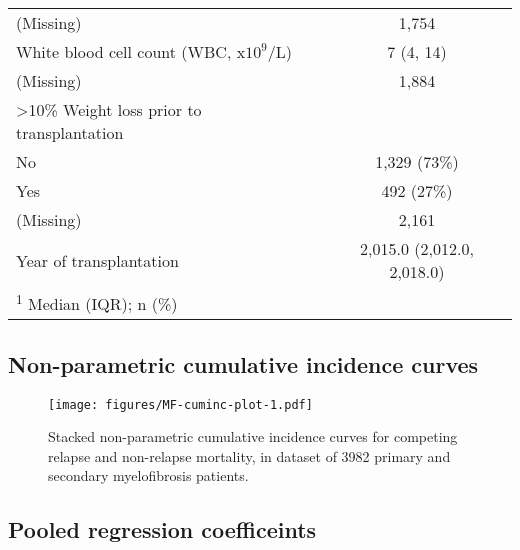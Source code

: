 \documentclass[
  12pt,
  a4paper,
]{article}
\begin{document}
\begin{longtable}[t]{lc}
\hspace{1em}(Missing) & 1,754\\
White blood cell count (WBC, x$10^9$/L) & 7 (4, 14)\\
\hspace{1em}(Missing) & 1,884\\
>10\% Weight loss prior to transplantation & \\
\hspace{1em}No & 1,329 (73\%)\\
\hspace{1em}Yes & 492 (27\%)\\
\hspace{1em}(Missing) & 2,161\\
Year of transplantation & 2,015.0 (2,012.0, 2,018.0)\\
\bottomrule
\multicolumn{2}{l}{\rule{0pt}{1em}\textsuperscript{1} Median (IQR); n (\%)}\\
\end{longtable}

\hypertarget{non-parametric-cumulative-incidence-curves}{%
\subsection{Non-parametric cumulative incidence
curves}\label{non-parametric-cumulative-incidence-curves}}

\begin{figure}[H]

{\centering \texttt{[image: figures/MF-cuminc-plot-1.pdf]}

}

\caption{Stacked non-parametric cumulative incidence curves for
competing relapse and non-relapse mortality, in dataset of 3982 primary
and secondary myelofibrosis patients.}

\end{figure}

\hypertarget{pooled-regression-coefficeints}{%
\subsection{Pooled regression
coefficeints}\label{pooled-regression-coefficeints}}

\begingroup\fontsize{9}{11}\selectfont
\end{document}
